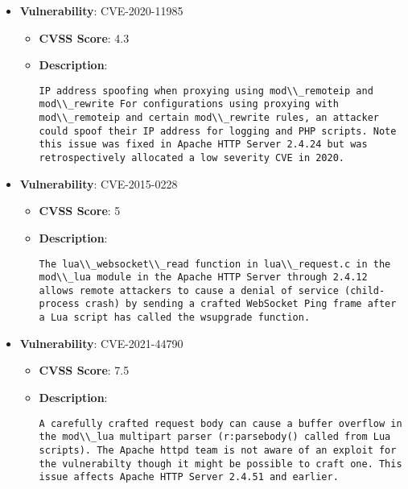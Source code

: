 \documentclass{article}
\begin{document}
\begin{itemize}
        \item \textbf{Vulnerability}: CVE-2020-11985
        \begin{itemize}
            \item \textbf{CVSS Score}:  4.3 
            \item \textbf{Description}:
            \parbox[t]{0.9\linewidth}{
                \verb|IP address spoofing when proxying using mod\\_remoteip and mod\\_rewrite For configurations using proxying with mod\\_remoteip and certain mod\\_rewrite rules, an attacker could spoof their IP address for logging and PHP scripts. Note this issue was fixed in Apache HTTP Server 2.4.24 but was retrospectively allocated a low severity CVE in 2020.|
            }
        \end{itemize}
    
        \item \textbf{Vulnerability}: CVE-2015-0228
        \begin{itemize}
            \item \textbf{CVSS Score}:  5 
            \item \textbf{Description}:
            \parbox[t]{0.9\linewidth}{
                \verb|The lua\\_websocket\\_read function in lua\\_request.c in the mod\\_lua module in the Apache HTTP Server through 2.4.12 allows remote attackers to cause a denial of service (child-process crash) by sending a crafted WebSocket Ping frame after a Lua script has called the wsupgrade function.|
            }
        \end{itemize}
    
        \item \textbf{Vulnerability}: CVE-2021-44790
        \begin{itemize}
            \item \textbf{CVSS Score}:  7.5 
            \item \textbf{Description}:
            \parbox[t]{0.9\linewidth}{
                \verb|A carefully crafted request body can cause a buffer overflow in the mod\\_lua multipart parser (r:parsebody() called from Lua scripts). The Apache httpd team is not aware of an exploit for the vulnerabilty though it might be possible to craft one. This issue affects Apache HTTP Server 2.4.51 and earlier.|
            }
        \end{itemize}
    

\end{itemize}
\end{document}
